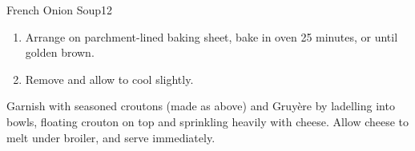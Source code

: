 \begin{recipe}{French Onion Soup}{}{12}
\begin{enumerate}
    garlic powder to taste.
  \item Arrange on parchment-lined baking sheet, bake in oven 25
    minutes, or until golden brown.
  \item Remove and allow to cool slightly.
  \end{enumerate}
  \begin{note}
    Garnish with seasoned croutons (made as above) and Gruy\`ere by
    ladelling into bowls, floating crouton on top and sprinkling
    heavily with cheese.  Allow cheese to melt under broiler, and
    serve immediately.
  \end{note}
\end{recipe}

